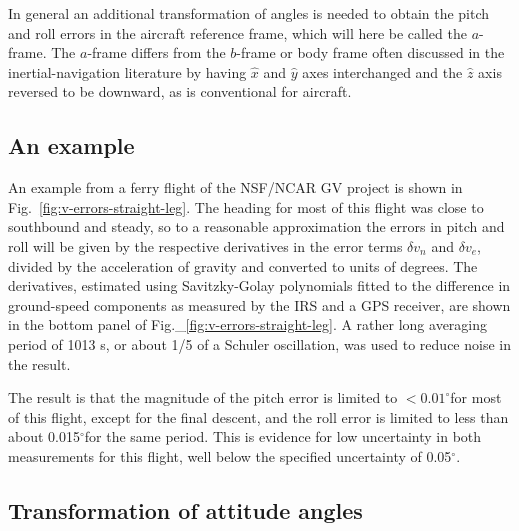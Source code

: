 \documentclass[english,british,amtd,bookmarks=false,unicode=true]{copernicus}\usepackage[]{graphicx}\usepackage[]{color}
\begin{document}
In general an additional transformation of angles is needed to obtain
the pitch and roll errors in the aircraft reference frame, which will
here be called the $a$-frame. The $a$-frame differs from the $b$-frame
or body frame often discussed in the inertial-navigation literature
by having $\hat{x}$ and $\hat{y}$ axes interchanged and the $\hat{z}$
axis reversed to be downward, as is conventional for aircraft.


\subsection{An example}



An example from a ferry flight of the NSF/NCAR GV project is shown
in Fig.~\ref{fig:v-errors-straight-leg}. The heading for most of
this flight was close to southbound and steady, so to a reasonable
approximation the errors in pitch and roll will be given by the respective
derivatives in the error terms $\delta v_{n}$ and $\delta v_{e}$,
divided by the acceleration of gravity and converted to units of degrees.
The derivatives, estimated using Savitzky-Golay polynomials fitted
to the difference in ground-speed components as measured by the IRS
and a GPS receiver, are shown in the bottom panel of Fig.\_\ref{fig:v-errors-straight-leg}.
A rather long averaging period of 1013 s, or about 1/5 of a Schuler
oscillation, was used to reduce noise in the result.

The result is that the magnitude of the pitch error is limited to
$<0.01^{\circ}$for most of this flight, except for the final descent,
and the roll error is limited to less than about 0.015$^{\circ}$for
the same period. This is evidence for low uncertainty in both measurements
for this flight, well below the specified uncertainty of 0.05$^{\circ}$. 


\subsection{Transformation of attitude angles}
\end{document}
